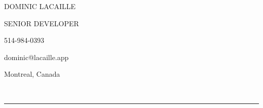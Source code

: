 \documentclass{article}
\begin{document}

\thispagestyle{empty}

\noindent
\begin{minipage}{12cm}
  \vspace{0.5em}
  {\fontsize{33}{33}\noindent\selectfont\uppercase{Dominic Lacaille}\par}
  \vspace{1em}
  {\noindent\large\trackingwide\uppercase{Senior Developer}\par}
\end{minipage}
\hfill
\begin{minipage}{4cm}
  {\faPhone*\hspace{1.5em}514-984-0393\par}
  \vspace{0.5em}
  {\faEnvelope\hspace{1.5em}dominic@lacaille.app\par}
  \vspace{0.5em}
  {\faCanadianMapleLeaf\hspace{1.5em}Montreal, Canada\par}
\end{minipage}

\

\par\noindent\rule{\textwidth}{0.4pt}

\vspace{3em}
\end{document}
